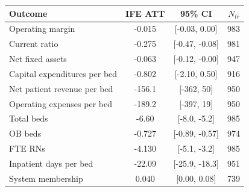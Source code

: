 \begin{tabular}{lccr}
\toprule
Outcome & IFE ATT & 95\% CI & $N_{tr}$ \\
\midrule
Operating margin & -0.015 & [-0.03, 0.00] & 983 \\
Current ratio & -0.275 & [-0.47, -0.08] & 981 \\
Net fixed assets & -0.063 & [-0.12, -0.00] & 947 \\
Capital expenditures per bed & -0.802 & [-2.10, 0.50] & 916 \\
Net patient revenue per bed & -156.1 & [-362, 50] & 950 \\
Operating expenses per bed & -189.2 & [-397, 19] & 950 \\
\addlinespace
Total beds & -6.60 & [-8.0, -5.2] & 985 \\
OB beds & -0.727 & [-0.89, -0.57] & 974 \\
FTE RNs & -4.130 & [-5.1, -3.2] & 985 \\
Inpatient days per bed & -22.09 & [-25.9, -18.3] & 951 \\
\addlinespace
System membership & 0.040 & [0.00, 0.08] & 739 \\
\bottomrule
\end{tabular}
